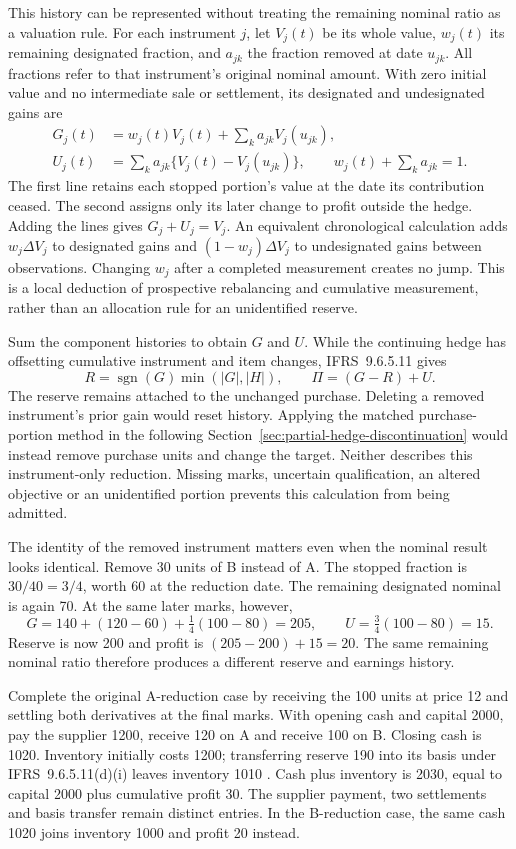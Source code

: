 This history can be represented without treating the remaining nominal ratio
as a valuation rule. For each instrument \(j\), let \(V_j(t)\) be its whole
value, \(w_j(t)\) its remaining designated fraction, and \(a_{jk}\) the
fraction removed at date \(u_{jk}\). All fractions refer to that instrument's
original nominal amount. With zero initial value and no intermediate sale or
settlement, its designated and undesignated gains are
\[
 \begin{aligned}
 G_j(t)&=w_j(t)V_j(t)+\sum_k a_{jk}V_j(u_{jk}),\\
 U_j(t)&=\sum_k a_{jk}\{V_j(t)-V_j(u_{jk})\},\qquad
 w_j(t)+\sum_k a_{jk}=1.
 \end{aligned}
\]
The first line retains each stopped portion's value at the date its contribution
ceased. The second assigns only its later change to profit outside the hedge.
Adding the lines gives \(G_j+U_j=V_j\). An equivalent chronological calculation
adds \(w_j\Delta V_j\) to designated gains and
\((1-w_j)\Delta V_j\) to undesignated gains between observations. Changing
\(w_j\) after a completed measurement creates no jump. This is a local
deduction of prospective rebalancing and cumulative measurement, rather than
an allocation rule for an unidentified reserve.

Sum the component histories to obtain \(G\) and \(U\). While the continuing
hedge has offsetting cumulative instrument and item changes, IFRS~9.6.5.11 gives
\[
 R=\operatorname{sgn}(G)\min(|G|,|H|),\qquad
 \Pi=(G-R)+U.
\]
The reserve remains attached to the unchanged purchase. Deleting a removed
instrument's prior gain would reset history. Applying the matched purchase-portion method in the following
Section~\ref{sec:partial-hedge-discontinuation} would instead remove purchase
units and change the target.
Neither describes this instrument-only reduction. Missing marks, uncertain
qualification, an altered objective or an unidentified portion prevents this
calculation from being admitted.

The identity of the removed instrument matters even when the nominal result
looks identical. Remove 30 units of B instead of A. The stopped fraction is
\(30/40=3/4\), worth 60 at the reduction date. The remaining designated
nominal is again 70. At the same later marks, however,
\[
 G=140+(120-60)+\tfrac14(100-80)=205,\qquad
 U=\tfrac34(100-80)=15.
\]
Reserve is now 200 and profit is \((205-200)+15=20\). The same remaining
nominal ratio therefore produces a different reserve and earnings history.

Complete the original A-reduction case by receiving the 100 units at price 12
and settling both derivatives at the final marks. With opening cash and capital
2000, pay the supplier 1200, receive 120 on A and receive 100 on B. Closing cash
is 1020. Inventory initially costs 1200; transferring reserve 190 into its
basis under IFRS~9.6.5.11(d)(i) leaves inventory 1010
\citep[IFRS~9.6.5.11]{eu20231803}. Cash plus inventory is 2030, equal to capital
2000 plus cumulative profit 30. The supplier payment, two settlements and basis
transfer remain distinct entries. In the B-reduction case, the same cash 1020
joins inventory 1000 and profit 20 instead.

